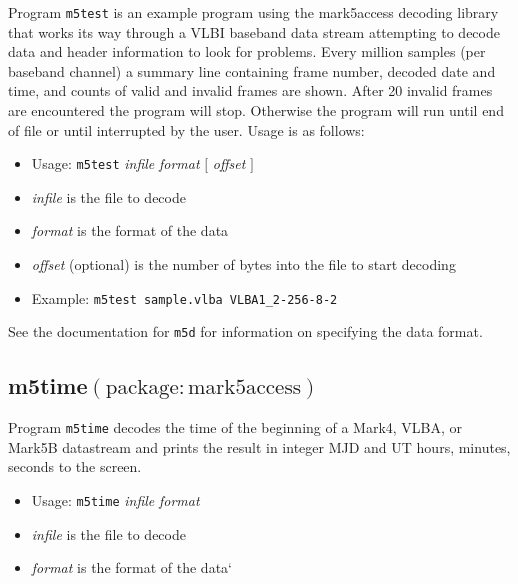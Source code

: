 Program {\tt m5test} is an example program using the mark5access decoding library that works its way through a VLBI baseband data stream attempting to decode data and header information to look for problems.
Every million samples (per baseband channel) a summary line containing frame number, decoded date and time, and counts of valid and invalid frames are shown.
After 20 invalid frames are encountered the program will stop.  
Otherwise the program will run until end of file or until interrupted by the user.
Usage is as follows:

\begin{itemize}
\item[] Usage: {\tt m5test} {\em infile} {\em format} $[$ {\em offset} $]$ 
\item[] {\em infile} is the file to decode
\item[] {\em format} is the format of the data
\item[] {\em offset} (optional) is the number of bytes into the file to start decoding
\item[] Example: {\tt m5test sample.vlba VLBA1\_2-256-8-2}
\end{itemize}

See the documentation for {\tt m5d} for information on specifying the data format.






\subsection{m5time{\small $\mathrm{(package: mark5access)}$}} \label{sec:m5time}

Program {\tt m5time} decodes the time of the beginning of a Mark4, VLBA, or Mark5B datastream and prints the result in integer MJD and UT hours, minutes, seconds to the screen.

\begin{itemize}
\item[] Usage: {\tt m5time} {\em infile} {\em format}
\item[] {\em infile} is the file to decode
\item[] {\em format} is the format of the data`
\end{itemize}





